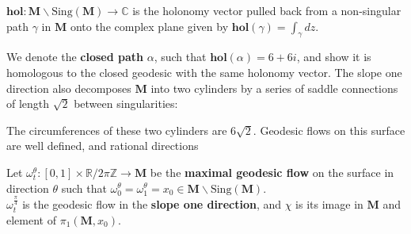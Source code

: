 \documentclass[]{article}
\begin{document}
\begin{Def}
$\mathbf{hol}:\mathbf{M}\backslash\text{Sing}(\mathbf{M})\rightarrow\mathbb{C}$ is the holonomy vector pulled back from a non-singular path $\gamma$ in $\mathbf{M}$ onto the complex plane given by $\mathbf{hol}(\gamma)=\int_{\gamma}dz$.
\end{Def}

We denote the \textbf{closed path} $\alpha$, such that $\mathbf{hol}(\alpha)=6+6i$, and show it is homologous to the closed geodesic with the same holonomy vector. The slope one direction also decomposes $\mathbf{M}$ into two cylinders by a series of saddle connections of length $\sqrt{2}$ between singularities:



The circumferences of these two cylinders are $6\sqrt{2}$. Geodesic flows on this surface are well defined, and rational directions 

\begin{Def}
Let $\omega^{\theta}_t:[0,1]\times\mathbb{R}/2\pi\mathbb{Z}\rightarrow\mathbf{M}$ be the \textbf{maximal geodesic flow} on the surface in direction $\theta$ such that $\omega^{\theta}_0=\omega^{\theta}_1=x_0\in\mathbf{M}\backslash\text{Sing}(\mathbf{M})$.\\
$\omega^{\frac{\pi}{4}}_t$ is the geodesic flow in the \textbf{slope one direction}, and $\chi$ is its image in $\mathbf{M}$ and element of $\pi_1(\mathbf{M},x_0)$.
\end{Def}
\end{document}
